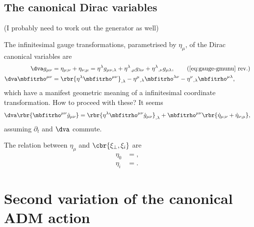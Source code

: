 \documentclass[a4paper,11pt]{article}
\begin{document}

\subsection{The canonical Dirac variables}


(I probably need to work out the generator as well)

The infinitesimal gauge transformations, parametrised by $\eta_\mu$, of the 
Dirac canonical variables are
\begin{align}
\dva g_{\mu\nu} &= \eta_{\mu;\nu} + \eta_{\nu;\mu} =
\eta^\lambda g_{\mu\nu,\lambda} + \eta^{\lambda}{}_{,\mu}g_{\lambda\nu}
+\eta^{\lambda}{}_{,\nu}g_{\mu\lambda},
\tag{\ref{eq:gauge-gmunu} rev.} \\
\dva \mbfitrho^{\mu\nu} &= \rbr{\eta^\lambda \mbfitrho^{\mu\nu}}_{,\lambda}
- \eta^\mu{}_{,\lambda}\mbfitrho^{\lambda\nu}
- \eta^\nu{}_{,\lambda}\mbfitrho^{\mu\lambda},
\end{align}
which have a manifest geometric meaning of a infinitesimal coordinate 
transformation. How to proceed with these? It seems
\begin{align}
\dva\rbr{\mbfitrho^{\mu\nu} \dot{g}_{\mu\nu}} =
\rbr{\eta^\lambda \mbfitrho^{\mu\nu} \dot{g}_{\mu\nu}}_{,\lambda} +
\mbfitrho^{\mu\nu}\rbr{\dot{\eta}_{\mu;\nu}+\dot{\eta}_{\nu;\mu}},
\end{align}
assuming $\partial_t$ and $\dva$ commute.


The relation between $\eta_\mu$ and $\cbr{\xi_\perp, \xi_i}$ are
\begin{align}
\eta_0 &= ,
\\
\eta_i &= .
\end{align}


\section{Second variation of the canonical ADM action}

\end{document}
